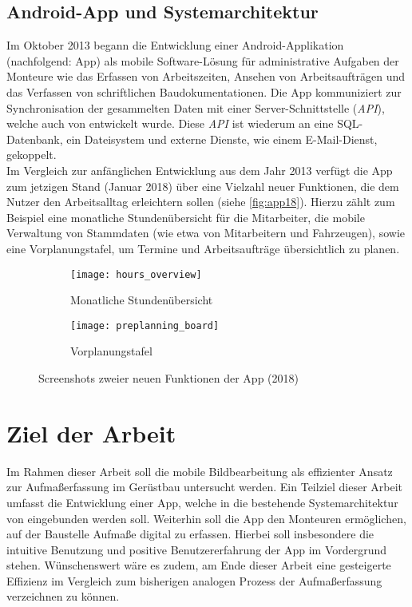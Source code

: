 \subsection{Android-App und Systemarchitektur}
Im Oktober 2013 begann die Entwicklung einer Android-Applikation (nachfolgend: App) als mobile Software-Lösung für administrative Aufgaben der Monteure wie das Erfassen von Arbeitszeiten, Ansehen von Arbeitsaufträgen und das Verfassen von schriftlichen Baudokumentationen.
Die App kommuniziert zur Synchronisation der gesammelten Daten mit einer Server-Schnittstelle (\emph{API}), welche auch von \vr{} entwickelt wurde.
Diese \emph{API} ist wiederum an eine SQL-Datenbank, ein Dateisystem und externe Dienste, wie einem E-Mail-Dienst, gekoppelt. \\

Im Vergleich zur anfänglichen Entwicklung aus dem Jahr 2013 verfügt die App zum jetzigen Stand (Januar 2018) über eine Vielzahl neuer Funktionen, die dem Nutzer den Arbeitsalltag erleichtern sollen (siehe \autoref{fig:app18}).
Hierzu zählt zum Beispiel eine monatliche Stundenübersicht für die Mitarbeiter, die mobile Verwaltung von Stammdaten (wie etwa von Mitarbeitern und Fahrzeugen), sowie eine Vorplanungstafel, um Termine und Arbeitsaufträge übersichtlich zu planen. 

\begin{figure}[h]
  \centering
  \begin{subfigure}[t]{0.4\textwidth}
    \texttt{[image: hours\_overview]}
    \caption{Monatliche Stundenübersicht}
  \end{subfigure}
  \begin{subfigure}[t]{0.4\textwidth}
    \texttt{[image: preplanning\_board]}
    \caption{Vorplanungstafel}
  \end{subfigure}
  \caption{Screenshots zweier neuen Funktionen der App (2018)}
  \label{fig:app18}
\end{figure}

\section{Ziel der Arbeit}
Im Rahmen dieser Arbeit soll die mobile Bildbearbeitung als effizienter Ansatz zur Aufmaßerfassung im Gerüstbau untersucht werden.
Ein Teilziel dieser Arbeit umfasst die Entwicklung einer App, welche in die bestehende Systemarchitektur von \vr{} eingebunden werden soll.
Weiterhin soll die App den Monteuren ermöglichen, auf der Baustelle Aufmaße digital zu erfassen.
Hierbei soll insbesondere die intuitive Benutzung und positive Benutzererfahrung der App im Vordergrund stehen.
Wünschenswert wäre es zudem, am Ende dieser Arbeit eine gesteigerte Effizienz im Vergleich zum bisherigen analogen Prozess der Aufmaßerfassung verzeichnen zu können.

